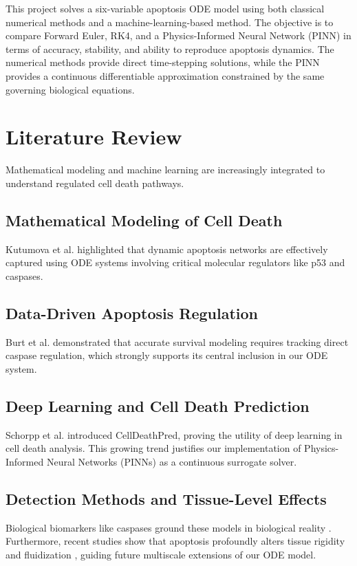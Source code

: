 \documentclass[conference]{IEEEtran}
\begin{document}
This project solves a six-variable apoptosis ODE model using both classical numerical methods and a machine-learning-based method. The objective is to compare Forward Euler, RK4, and a Physics-Informed Neural Network (PINN) in terms of accuracy, stability, and ability to reproduce apoptosis dynamics. The numerical methods provide direct time-stepping solutions, while the PINN provides a continuous differentiable approximation constrained by the same governing biological equations.

\section{Literature Review}

Mathematical modeling and machine learning are increasingly integrated to understand regulated cell death pathways.

\subsection{Mathematical Modeling of Cell Death}
Kutumova et al. \cite{kutumova2025} highlighted that dynamic apoptosis networks are effectively captured using ODE systems involving critical molecular regulators like p53 and caspases.

\subsection{Data-Driven Apoptosis Regulation}
Burt et al. \cite{burt2022} demonstrated that accurate survival modeling requires tracking direct caspase regulation, which strongly supports its central inclusion in our ODE system.

\subsection{Deep Learning and Cell Death Prediction}
Schorpp et al. \cite{schorpp2023} introduced CellDeathPred, proving the utility of deep learning in cell death analysis. This growing trend justifies our implementation of Physics-Informed Neural Networks (PINNs) as a continuous surrogate solver.

\subsection{Detection Methods and Tissue-Level Effects}
Biological biomarkers like caspases ground these models in biological reality \cite{kari2022}. Furthermore, recent studies show that apoptosis profoundly alters tissue rigidity and fluidization \cite{softmatter2022,prl2024}, guiding future multiscale extensions of our ODE model.
\end{document}
